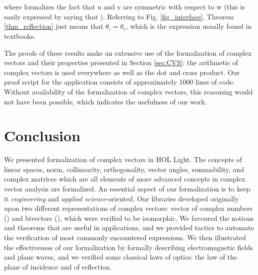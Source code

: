 \documentclass{llncs}
\begin{document}
{\begin{theorem}
  \ \\
  \ \\
\end{theorem}
\noindent where  formalizes the fact that \hol u and \hol v  are symmetric with respect to \hol w
(this is easily expressed by saying that ).
Referring to Fig. \ref{fig_interface}, Theorem \ref{thm_reflection} just means that $\theta_i=\theta_r$, which is the expression usually found in textbooks.


The proofs of these results make an extensive use of the formalization of complex vectors and their properties presented in Section \ref{sec:CVS}:
the arithmetic of complex vectors is used everywhere as well as the dot and cross product. Our proof script  for the application consists of approximately 1000 lines of code.
Without availability of the formalization of complex vectors, this reasoning would not have been possible, which indicates the usefulness of  our work.

  

  \section{Conclusion}
  \label{sec:conclusion}

	We presented formalization of  complex vectors in HOL Light. 
The concepts of linear spaces, norm, collinearity, orthogonality, vector angles, summability, and complex matrices which are all elements of more advanced concepts in complex vector analysis are formalized.
	An essential aspect of our formalization is to keep it \emph{engineering} and \emph{applied science}-oriented. 
Our libraries developed originally upon two different representations of complex vectors: vector of complex numbers () and bivectors (), which were verified to be isomorphic.
	We favoured the notions and theorems that are useful in applications,
	and we provided tactics to automate the verification of most commonly encountered expressions.
We then illustrated the effectiveness of our formalization by formally describing electromagnetic fields and plane waves, 
	and we verified some classical laws of optics:
	the law of the plane of incidence and of reflection.

}
\end{document}
